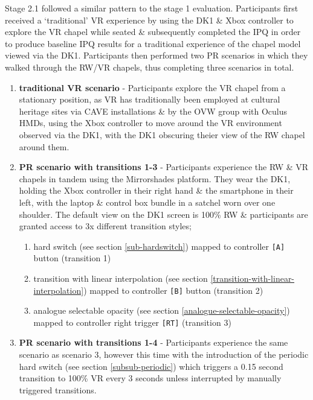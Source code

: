 Stage 2.1 followed a similar pattern to the stage 1 evaluation. Participants first received a `traditional' VR experience by using the DK1 \& Xbox controller to explore the VR chapel while seated \& subsequently completed the IPQ in order to produce baseline IPQ results for a traditional experience of the chapel model viewed via the DK1. Participants then performed two PR scenarios in which they walked through the RW/VR chapels, thus completing three scenarios in total.

\begin{enumerate}
	\item \textbf{traditional VR scenario} - Participants explore the VR chapel from a stationary position, as VR has traditionally been employed at cultural heritage sites via CAVE installations \& by the OVW group with Oculus HMDs, using the Xbox controller to move around the VR environment observed via the DK1, with the DK1 obscuring theier view of the RW chapel around them.
	\item \textbf{PR scenario with transitions 1-3} - Participants experience the RW \& VR chapels in tandem using the Mirrorshades platform. They wear the DK1, holding the Xbox controller in their right hand \& the smartphone in their left, with the laptop \& control box bundle in a satchel worn over one shoulder. The default view on the DK1 screen is 100\% RW \& participants are granted access to 3x different transition styles;
	\begin{enumerate}
		\item hard switch (see section \ref{sub-hardswitch}) mapped to controller \texttt{[A]} button (transition 1)
		\item transition with linear interpolation (see section \ref{transition-with-linear-interpolation}) mapped to controller \texttt{[B]} button (transition 2)
		\item analogue selectable opacity (see section \ref{analogue-selectable-opacity}) mapped to controller right trigger \texttt{[RT]} (transition 3)
\end{enumerate}
	\item \textbf{PR scenario with transitions 1-4} - Participants experience the same scenario as scenario 3, however this time with the introduction of the periodic hard switch (see section \ref{subsub-periodic}) which triggers a 0.15 second transition to 100\% VR every 3 seconds unless interrupted by manually triggered transitions.
\end{enumerate}


